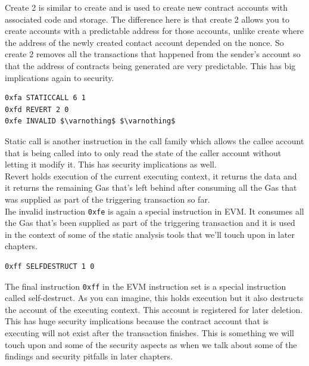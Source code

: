 Create 2 is similar to create and is used to create new contract accounts with associated code and storage.
The difference here is that create 2 allows you to create accounts with a predictable address for those accounts, unlike create where the address of the newly created contact account depended on the nonce.
So create 2 removes all the transactions that happened from the sender's account so that the address of contracts being generated are very predictable.
This has big implications again to security.

\begin{lstlisting}[style=defaultStyle, caption={Static call, revert and invalid instructions.}, mathescape=true]
0xfa STATICCALL 6 1
0xfd REVERT 2 0
0xfe INVALID $\varnothing$ $\varnothing$
\end{lstlisting}

Static call is another instruction in the call family which allows the callee account that is being called into to only read the state of the caller account without letting it modify it.
This has security implications as well.\\

Revert holds execution of the current executing context, it returns the data and it returns the remaining Gas that's left behind after consuming all the Gas that was supplied as part of the triggering transaction so far.\\

Ihe invalid instruction \texttt{0xfe} is again a special instruction in EVM.
It consumes all the Gas that's been supplied as part of the triggering transaction and it is used in the context of some of the static analysis tools that we'll touch upon in later chapters.\\

\begin{lstlisting}[style=defaultStyle, caption={Self destruct instruction}]
0xff SELFDESTRUCT 1 0
\end{lstlisting}

The final instruction \texttt{0xff} in the EVM instruction set is a special instruction called self-destruct.
As you can imagine, this holds execution but it also destructs the account of the executing context.
This account is registered for later deletion.
This has huge security implications because the contract account that is executing will not exist after the transaction finishes.
This is something we will touch upon and some of the security aspects as when we talk about some of the findings and security pitfalls in later chapters.\\

